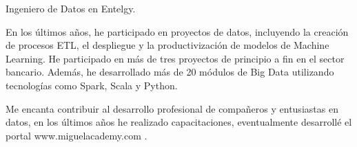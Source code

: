 

\begin{cvparagraph}


Ingeniero de Datos en Entelgy.

En los últimos años, he participado en proyectos de datos, incluyendo la creación de procesos ETL, el despliegue y la productivización de modelos de Machine Learning.
He participado en más de tres proyectos de principio a fin en el sector bancario.
Además, he desarrollado más de 20 módulos de Big Data utilizando tecnologías como Spark, Scala y Python.


Me encanta contribuir al desarrollo profesional de compañeros y entusiastas en datos,
en los últimos años he realizado capacitaciones, eventualmente desarrollé el portal www.miguelacademy.com .

\end{cvparagraph}
